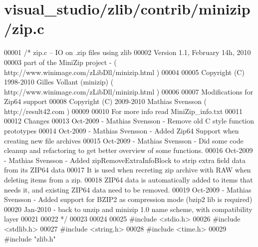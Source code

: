 \hypertarget{visual__studio_2zlib_2contrib_2minizip_2zip_8c_source}{}\section{visual\+\_\+studio/zlib/contrib/minizip/zip.c}
\label{visual__studio_2zlib_2contrib_2minizip_2zip_8c_source}

\begin{DoxyCode}
00001 \textcolor{comment}{/* zip.c -- IO on .zip files using zlib}
00002 \textcolor{comment}{   Version 1.1, February 14h, 2010}
00003 \textcolor{comment}{   part of the MiniZip project - ( http://www.winimage.com/zLibDll/minizip.html )}
00004 \textcolor{comment}{}
00005 \textcolor{comment}{         Copyright (C) 1998-2010 Gilles Vollant (minizip) ( http://www.winimage.com/zLibDll/minizip.html )}
00006 \textcolor{comment}{}
00007 \textcolor{comment}{         Modifications for Zip64 support}
00008 \textcolor{comment}{         Copyright (C) 2009-2010 Mathias Svensson ( http://result42.com )}
00009 \textcolor{comment}{}
00010 \textcolor{comment}{         For more info read MiniZip\_info.txt}
00011 \textcolor{comment}{}
00012 \textcolor{comment}{         Changes}
00013 \textcolor{comment}{   Oct-2009 - Mathias Svensson - Remove old C style function prototypes}
00014 \textcolor{comment}{   Oct-2009 - Mathias Svensson - Added Zip64 Support when creating new file archives}
00015 \textcolor{comment}{   Oct-2009 - Mathias Svensson - Did some code cleanup and refactoring to get better overview of some
       functions.}
00016 \textcolor{comment}{   Oct-2009 - Mathias Svensson - Added zipRemoveExtraInfoBlock to strip extra field data from its ZIP64
       data}
00017 \textcolor{comment}{                                 It is used when recreting zip archive with RAW when deleting items from a
       zip.}
00018 \textcolor{comment}{                                 ZIP64 data is automatically added to items that needs it, and existing
       ZIP64 data need to be removed.}
00019 \textcolor{comment}{   Oct-2009 - Mathias Svensson - Added support for BZIP2 as compression mode (bzip2 lib is required)}
00020 \textcolor{comment}{   Jan-2010 - back to unzip and minizip 1.0 name scheme, with compatibility layer}
00021 \textcolor{comment}{}
00022 \textcolor{comment}{*/}
00023 
00024 
00025 \textcolor{preprocessor}{#include <stdio.h>}
00026 \textcolor{preprocessor}{#include <stdlib.h>}
00027 \textcolor{preprocessor}{#include <string.h>}
00028 \textcolor{preprocessor}{#include <time.h>}
00029 \textcolor{preprocessor}{#include "zlib.h"}

\end{DoxyCode}
